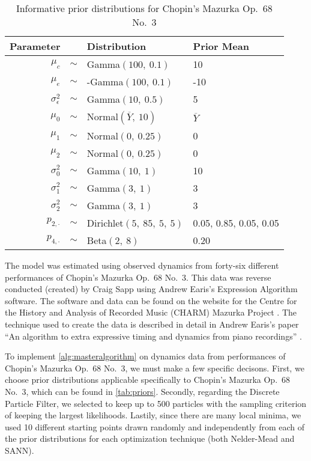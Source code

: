 \documentclass[12pt]{article}
\begin{document}
\begin{table}[t]
  \caption{Informative prior distributions for Chopin's Mazurka Op.\ 68 No.\ 3}
  \centering
  \begin{tabular}{@{}rcll@{}}
    \toprule
    Parameter & \phantom{a} & Distribution & Prior Mean \\
    \midrule
    $\mu_c$ & $\sim$ & Gamma$(100,\ 0.1)$ & 10\\
    $\mu_e$ & $\sim$ & -Gamma$(100,\ 0.1)$ & -10\\
    $\sigma^2_{\epsilon}$ & $\sim$ & Gamma$(10,\ 0.5)$ & 5\\
    $\mu_{0}$ & $\sim$ & Normal$(\overline{Y},\ 10)$ & $\overline{Y}$\\
    $\mu_{1} $ & $\sim$ & Normal$(0,\ 0.25)$ & 0\\
    $\mu_{2} $ & $\sim$ & Normal$(0,\ 0.25)$ & 0\\
    $\sigma^2_{0} $ & $\sim$ & Gamma$(10,\ 1)$ & 10 \\
    $\sigma^2_{1} $ & $\sim$ & Gamma$(3,\ 1)$ & 3 \\
    $\sigma^2_{2} $ & $\sim$ & Gamma$(3,\ 1)$ & 3 \\
    $p_{2,\cdot}$ & $\sim$ & Dirichlet$(5,\ 85,\ 5,\ 5)$ & 0.05, 0.85, 0.05, 0.05 \\
    $p_{4,\cdot}$ & $\sim$ & Beta$(2,\ 8)$ & 0.20\\
    \bottomrule
  \end{tabular}
  \label{tab:priors}
\end{table}

The model was estimated using observed dynamics from forty-six different
performances of Chopin's Mazurka Op.~68 No.~3. This data was reverse
conducted (created) by Craig Sapp using Andrew Earis's Expression
Algorithm software. The software and data can be found on the website
for the Centre for the History and Analysis of Recorded Music (CHARM)
Mazurka Project \citep{charm_centre_2009}. The technique used to create
the data is described in detail in Andrew Earis's paper ``An algorithm
to extra expressive timing and dynamics from piano recordings''
\citep{earis_algorithm_2007}.

To implement \autoref{alg:masteralgorithm} on dynamics data from
performances of Chopin's Mazurka Op.~68 No.~3, we must make a few
specific decisons. First, we choose prior distributions applicable
specifically to Chopin's Mazurka Op.~68 No.~3, which can be found in
\autoref{tab:priors}. Secondly, regarding the Discrete Particle Filter,
we selected to keep up to 500 particles with the sampling criterion of
keeping the largest likelihoods. Lastily, since there are many local
minima, we used 10 different starting points drawn randomly and
independently from each of the prior distributions for each optimization
technique (both Nelder-Mead and SANN).
\end{document}
